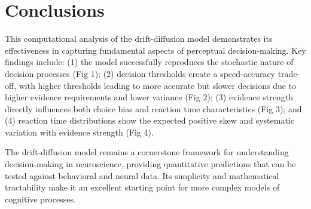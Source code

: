 \documentclass[11pt,a4paper]{article}
\begin{document}
\section{Conclusions}

This computational analysis of the drift-diffusion model demonstrates its effectiveness in capturing fundamental aspects of perceptual decision-making. Key findings include: (1) the model successfully reproduces the stochastic nature of decision processes (Fig 1); (2) decision thresholds create a speed-accuracy trade-off, with higher thresholds leading to more accurate but slower decisions due to higher evidence requirements and lower variance (Fig 2); (3) evidence strength directly influences both choice bias and reaction time characteristics (Fig 3); and (4) reaction time distributions show the expected positive skew and systematic variation with evidence strength (Fig 4).

The drift-diffusion model remains a cornerstone framework for understanding decision-making in neuroscience, providing quantitative predictions that can be tested against behavioral and neural data. Its simplicity and mathematical tractability make it an excellent starting point for more complex models of cognitive processes.




% 
\end{document}
